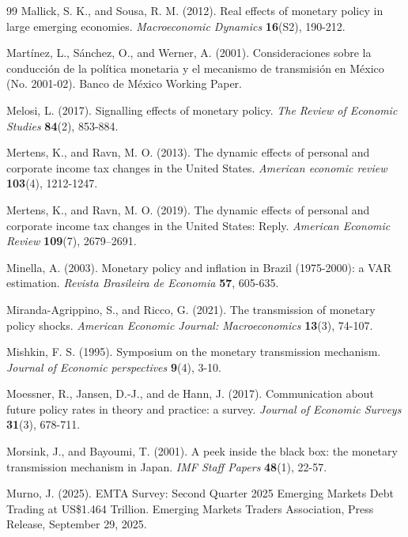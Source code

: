 \documentclass[12pt, reqno]{article}
\begin{document}
\begin{thebibliography}{99}
\bibitem{} \hypertarget{Mallick and Sousa (2012)}{} 
Mallick, S. K., and Sousa, R. M. (2012). Real effects of monetary policy in large emerging economies. \textit{Macroeconomic Dynamics} \textbf{16}(S2), 190-212.

\bibitem{} \hypertarget{Martinez et al. (2001)}{}Martínez, L., Sánchez, O., and Werner, A. (2001). Consideraciones sobre la conducción de la política monetaria y el mecanismo de transmisión en México (No. 2001-02). Banco de México Working Paper.

\bibitem{} \hypertarget{Melosi (2017)}{} Melosi, L. (2017). Signalling effects of monetary policy. \textit{The Review of Economic Studies} \textbf{84}(2), 853-884.

\bibitem{} \hypertarget{Mertens and Ravn (2013)}{}Mertens, K., and Ravn, M. O. (2013). The dynamic effects of personal and corporate income tax changes in the United States. \textit{American economic review} \textbf{103}(4), 1212-1247.

\bibitem{} \hypertarget{Mertens and Ravn (2019)}{}
Mertens, K., and Ravn, M. O. (2019). The dynamic effects of personal and corporate income tax changes in the United States: Reply. \textit{American Economic Review} \textbf{109}(7), 2679–2691.

\bibitem{} \hypertarget{Minella (2003)}{} 
Minella, A. (2003). Monetary policy and inflation in Brazil (1975-2000): a VAR estimation. \textit{Revista Brasileira de Economia} \textbf{57}, 605-635.

\bibitem{} \hypertarget{Miranda-Agrippino and Ricco (2021)}{} 
Miranda-Agrippino, S., and Ricco, G. (2021). The transmission of monetary policy shocks. \textit{American Economic Journal: Macroeconomics} \textbf{13}(3), 74-107.

\bibitem{} \hypertarget{Mishkin (1995)}{}Mishkin, F. S. (1995). Symposium on the monetary transmission mechanism. \textit{Journal of Economic perspectives} \textbf{9}(4), 3-10.

\bibitem{} \hypertarget{Moessner et al. (2017)}{} Moessner, R., Jansen, D.-J., and de Hann, J. (2017). Communication about future policy rates in 
theory and practice: a survey. \textit{Journal of Economic Surveys} \textbf{31}(3), 678-711.

\bibitem{} \hypertarget{Morsink and Bayoumi (2001)}{} Morsink, J., and Bayoumi, T. (2001). A peek inside the black box: the monetary transmission mechanism in Japan. \textit{IMF Staff Papers} \textbf{48}(1), 22-57.

\bibitem{} \hypertarget{Murno (2025)}{}
Murno, J. (2025). EMTA Survey: Second Quarter 2025 Emerging Markets Debt Trading at US\$1.464 Trillion. Emerging Markets Traders Association, Press Release, September 29, 2025.


\end{thebibliography}
\end{document}
